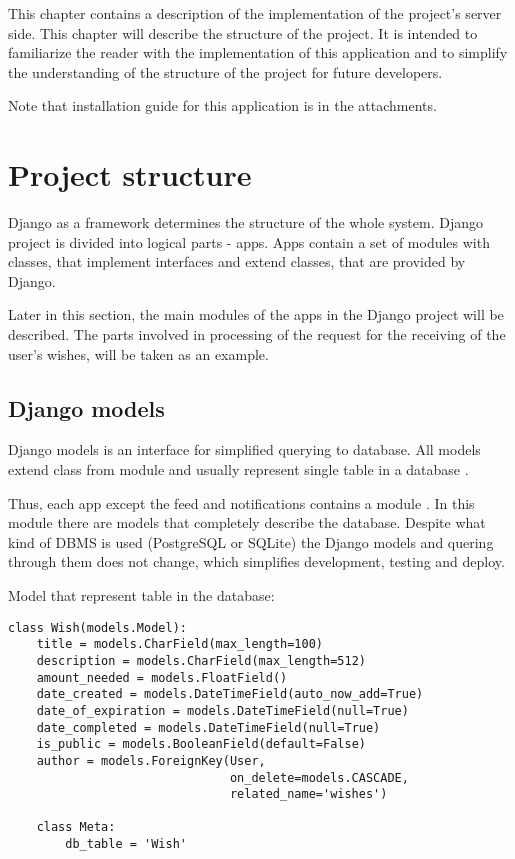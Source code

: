 This chapter contains a description of the implementation of the project's server side. This chapter will describe the
structure of the project. It is intended to familiarize the reader with the implementation of this application and to
simplify the understanding of the structure of the project for future developers.

Note that installation guide for this application is in the attachments.


\newcommand{\appitem}[1]{
\item\textbf{#1}.
}
\newcommand{\setitem}[1]{
\item\textbf{#1}.
}
\section{Project structure}
Django as a framework determines the structure of the whole system. Django project is divided into logical parts - apps.
Apps contain a set of modules with classes, that implement interfaces and extend classes, that are provided by Django.

Later in this section, the main modules of the apps in the Django project will be described. The parts involved in
processing of the request for the receiving of the user's wishes, will be taken as an example.

\subsection{Django models}
Django models is an interface for simplified querying to database. All models extend class  from
 module and usually represent single table in a database \cite{djangodocs}.

Thus, each app except the feed and notifications contains a module . In this module there are models that
completely describe the database. Despite what kind of DBMS is used (PostgreSQL or SQLite) the Django models and quering
through them does not change, which simplifies development, testing and deploy.

Model that represent table  in the database:
\begin{lstlisting}
class Wish(models.Model):
    title = models.CharField(max_length=100)
    description = models.CharField(max_length=512)
    amount_needed = models.FloatField()
    date_created = models.DateTimeField(auto_now_add=True)
    date_of_expiration = models.DateTimeField(null=True)
    date_completed = models.DateTimeField(null=True)
    is_public = models.BooleanField(default=False)
    author = models.ForeignKey(User,
                               on_delete=models.CASCADE,
                               related_name='wishes')

    class Meta:
        db_table = 'Wish'

\end{lstlisting}

